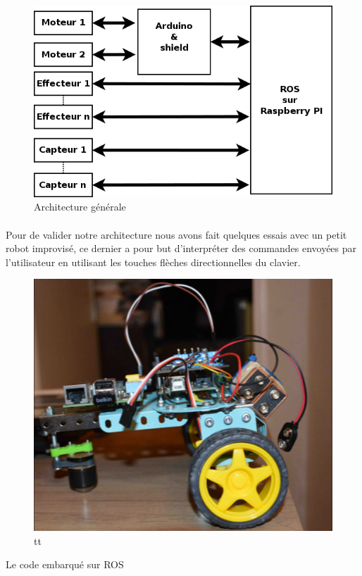 \documentclass[12pt,a4paper]{article}
\begin{document}
\begin{figure}[!h]
\centering
\includegraphics[width=10 cm]{img/archi_1.png}
\caption{Architecture générale}
\end{figure}

\paragraph{}
Pour de valider notre architecture nous avons fait quelques essais avec un petit robot improvisé, ce dernier
a pour but d'interpréter des commandes envoyées par l'utilisateur en utilisant les touches flèches directionnelles du clavier.

\begin{figure}[!h]
\centering
\includegraphics[width=10 cm]{img/robo_test.png}
\caption{tt}
\end{figure}

Le code embarqué sur ROS 

\begin{verbatim}
 
\end{verbatim}
\end{document}
